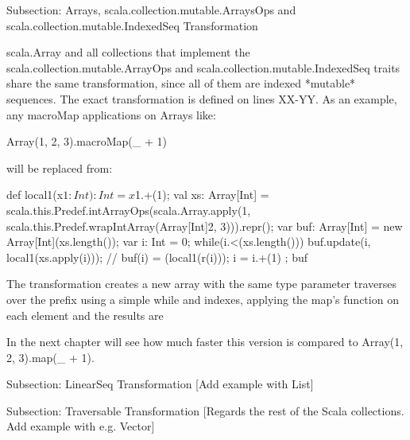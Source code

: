 Subsection: Arrays, scala.collection.mutable.ArraysOps and
scala.collection.mutable.IndexedSeq Transformation

scala.Array and all collections that implement the 
scala.collection.mutable.ArrayOps and scala.collection.mutable.IndexedSeq traits
share the same transformation, since all of them are indexed *mutable*
sequences. The exact transformation is defined on lines XX-YY. As an example,
any macroMap applications on Arrays like:

Array(1, 2, 3).macroMap(_ + 1)

will be replaced from:

{
  def local1(x$1: Int): Int = x$1.+(1);
  val xs: Array[Int] = scala.this.Predef.intArrayOps(scala.Array.apply(1,
scala.this.Predef.wrapIntArray(Array[Int]{2, 3}))).repr();
  var buf: Array[Int] = new Array[Int](xs.length());
  var i: Int = 0;
  while(i.<(xs.length())){
    buf.update(i, local1(xs.apply(i))); // buf(i) = (local1(r(i)));
    i = i.+(1)
  };
  buf
}

The transformation creates a new array with the same type parameter traverses
over the prefix using a simple while and indexes, applying the map's function on
each element and the results are 

In the next chapter will see how much faster this version is compared to
Array(1, 2, 3).map(_ + 1).


Subsection: LinearSeq Transformation
[Add example with List]


Subsection: Traversable Transformation
[Regards the rest of the Scala collections. Add example with e.g. Vector]
